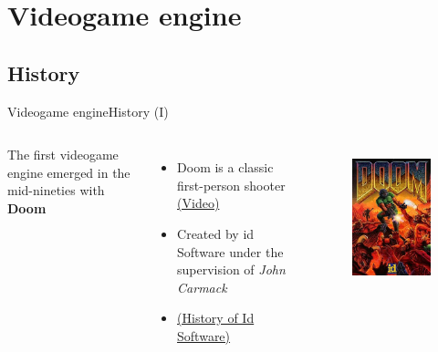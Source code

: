 \documentclass[10pt,compress]{beamer} %
\begin{document}
\section{Videogame engine}
\subsection{History}
\begin{frame}{Videogame engine}{History (I)}
    \begin{columns}
	The first videogame engine emerged in the mid-nineties with \textbf{Doom}
	\begin{itemize}
		\item Doom is a classic first-person shooter \href{http://www.youtube.com/watch?v=1BkjgGTvb8s}{(Video)}
		\item Created by id Software under the supervision of \textit{John Carmack}
		\item \href{http://www.ionlitio.com/historia-id-software-los-dos-johns/}{(History of Id Software)}
	\end{itemize}
   	 	\begin{figure}[t]
		\begin{center}
		    \includegraphics[width=0.7\linewidth]{figs/doom}\\
			\bigskip
		\end{center}
   	 	\end{figure}
    \end{columns}
\end{frame}
\end{document}
